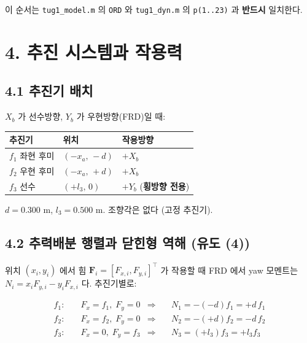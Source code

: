 \documentclass[10pt,a4paper]{article}
\begin{document}
이 순서는 \texttt{tug1\_model.m} 의 \texttt{ORD} 와 \texttt{tug1\_dyn.m} 의 \texttt{p(1..23)} 과 \textbf{반드시} 일치한다.

\section*{4. 추진 시스템과 작용력}

\subsection*{4.1 추진기 배치}

$X_b$ 가 선수방향, $Y_b$ 가 우현방향(FRD)일 때:

\begin{center}\footnotesize\setlength{\tabcolsep}{3pt}
\begin{tabular}{@{}lll@{}}
\toprule
\textbf{추진기} & \textbf{위치} & \textbf{작용방향} \\
\midrule
$f_1$ 좌현 후미 & $(-x_a,\, -d)$ & $+X_b$ \\
$f_2$ 우현 후미 & $(-x_a,\, +d)$ & $+X_b$ \\
$f_3$ 선수 & $(+l_3,\, 0)$ & $+Y_b$ (\textbf{횡방향 전용}) \\
\bottomrule
\end{tabular}
\end{center}

$d = 0.300$ m, $l_3 = 0.500$ m. 조향각은 없다 (고정 추진기).

\subsection*{4.2 추력배분 행렬과 닫힌형 역해 (유도 (4))}

위치 $(x_i, y_i)$ 에서 힘 $\mathbf{F}_i = [F_{x,i}, F_{y,i}]^\top$ 가 작용할 때 FRD 에서 yaw 모멘트는 $N_i = x_i F_{y,i} - y_i F_{x,i}$ 다. 추진기별로:

\begin{equation*}
\begin{aligned}
f_1:&\quad F_x = f_1,\; F_y = 0 &\Rightarrow&\quad N_1 = -(-d)f_1 = +d\,f_1 \\
f_2:&\quad F_x = f_2,\; F_y = 0 &\Rightarrow&\quad N_2 = -(+d)f_2 = -d\,f_2 \\
f_3:&\quad F_x = 0,\; F_y = f_3 &\Rightarrow&\quad N_3 = (+l_3)f_3 = +l_3 f_3
\end{aligned} \tag{19}
\end{equation*}
\end{document}
